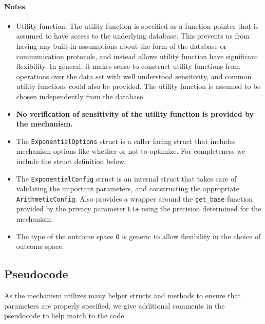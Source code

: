 \documentclass[11pt]{article}
\theoremstyle{definition}
\begin{document}
\paragraph{Notes}
\begin{itemize}
    \item Utility function. The utility function is specified as a function pointer that is assumed to have access to the underlying database. This prevents us from having any built-in assumptions about the form of the database or communication protocols, and instead allows utility function have significant flexibility. In general, it makes sense to construct utility functions from operations over the data set with well understood sensitivity, and common utility functions could also be provided. The utility function is assumed to be chosen independently from the database.
    \item \textbf{No verification of sensitivity of the utility function is provided by the mechanism.}
    \item The {\tt ExponentialOptions} struct is a caller facing struct that includes mechanism options like whether or not to optimize. For completeness we include the struct definition below.
    \item The {\tt ExponentialConfig} struct is an internal struct that takes care of validating the important parameters, and constructing the appropriate {\tt ArithmeticConfig}. Also provides a wrapper around the {\tt get\_base} function provided by the privacy parameter {\tt Eta} using the precision determined for the mechanism. 
    \item The type of the outcome space {\tt O} is generic to allow flexibility in the choice of outcome space.
\end{itemize}

\subsection{Pseudocode}
As the mechanism utilizes many helper structs and methods to ensure that parameters are properly specified, we give additional comments in the pseudocode to help match to the code. 
\end{document}
